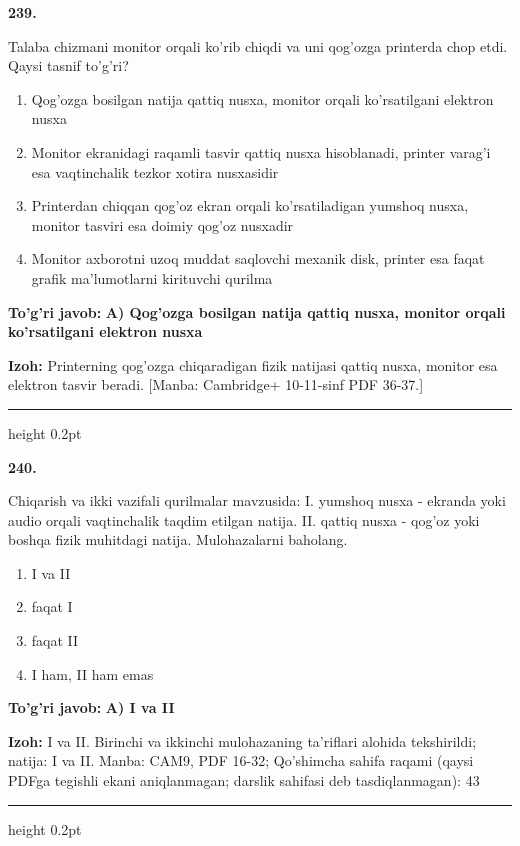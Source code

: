 \documentclass[10pt,a4paper]{article}
\begin{document}
{\bfseries\sffamily\color{ink} 239.}
\par
Talaba chizmani monitor orqali ko'rib chiqdi va uni qog'ozga printerda chop etdi. Qaysi tasnif to'g'ri?
\begin{enumerate}[label=\Alph*),leftmargin=9mm]
\item Qog'ozga bosilgan natija qattiq nusxa, monitor orqali ko'rsatilgani elektron nusxa
\item Monitor ekranidagi raqamli tasvir qattiq nusxa hisoblanadi, printer varag'i esa vaqtinchalik tezkor xotira nusxasidir
\item Printerdan chiqqan qog'oz ekran orqali ko'rsatiladigan yumshoq nusxa, monitor tasviri esa doimiy qog'oz nusxadir
\item Monitor axborotni uzoq muddat saqlovchi mexanik disk, printer esa faqat grafik ma'lumotlarni kirituvchi qurilma
\end{enumerate}
\begin{tcolorbox}[enhanced,breakable,colback=teal!4,colframe=teal!60!black,boxrule=0.45pt,arc=1.2mm,left=2.7mm,right=2.7mm,top=1.8mm,bottom=1.8mm,before skip=2mm,after skip=2mm]
{\bfseries\sffamily\color{teal}To'g'ri javob:} \textbf{A) Qog'ozga bosilgan natija qattiq nusxa, monitor orqali ko'rsatilgani elektron nusxa}
\par\smallskip
{\bfseries Izoh:} Printerning qog'ozga chiqaradigan fizik natijasi qattiq nusxa, monitor esa elektron tasvir beradi. [Manba: Cambridge+ 10-11-sinf PDF 36-37.]
\end{tcolorbox}
\vspace{2mm}\hrule height 0.2pt\vspace{3mm}

{\bfseries\sffamily\color{ink} 240.}
\par
Chiqarish va ikki vazifali qurilmalar mavzusida: I. yumshoq nusxa - ekranda yoki audio orqali vaqtinchalik taqdim etilgan natija. II. qattiq nusxa - qog'oz yoki boshqa fizik muhitdagi natija. Mulohazalarni baholang.
\begin{enumerate}[label=\Alph*),leftmargin=9mm]
\item I va II
\item faqat I
\item faqat II
\item I ham, II ham emas
\end{enumerate}
\begin{tcolorbox}[enhanced,breakable,colback=teal!4,colframe=teal!60!black,boxrule=0.45pt,arc=1.2mm,left=2.7mm,right=2.7mm,top=1.8mm,bottom=1.8mm,before skip=2mm,after skip=2mm]
{\bfseries\sffamily\color{teal}To'g'ri javob:} \textbf{A) I va II}
\par\smallskip
{\bfseries Izoh:} I va II. Birinchi va ikkinchi mulohazaning ta'riflari alohida tekshirildi; natija: I va II. Manba: CAM9, PDF 16-32; Qo'shimcha sahifa raqami (qaysi PDFga tegishli ekani aniqlanmagan; darslik sahifasi deb tasdiqlanmagan): 43
\end{tcolorbox}
\vspace{2mm}\hrule height 0.2pt\vspace{3mm}
\end{document}
